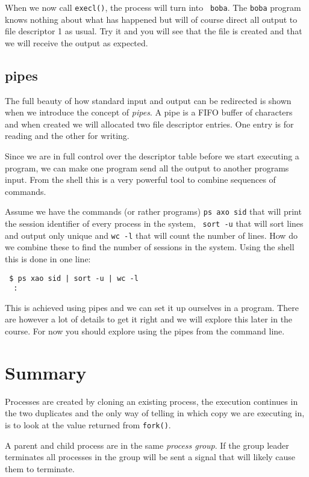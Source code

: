 \documentclass[a4paper,11pt]{article}
\begin{document}
When we now call {\tt execl()}, the process will turn into {\tt
  boba}. The {\tt boba} program knows nothing about what has happened
but will of course direct all output to file descriptor 1 as usual.
Try it and you will see that the file is created and that we will
receive the output as expected.

\subsection{pipes}

The full beauty of how standard input and output can be redirected is
shown when we introduce the concept of {\em pipes}. A pipe is a FIFO
buffer of characters and when created we will allocated two file
descriptor entries. One entry is for reading and the other for
writing. 

Since we are in full control over the descriptor table before we
start executing a program, we can make one program send all the output
to another programs input. From the shell this is a very powerful tool
to combine sequences of commands.

Assume we have the commands (or rather programs) {\tt ps axo sid} that
will print the session identifier of every process in the system, {\tt
  sort -u} that will sort lines and output only unique and {\tt wc -l}
that will count the number of lines. How do we combine these to find
the number of sessions in the system. Using the shell this is done in one line:

\begin{verbatim}
 $ ps xao sid | sort -u | wc -l
  :
\end{verbatim}

This is achieved using pipes and we can set it up ourselves in a
program. There are however a lot of details to get it right and we
will explore this later in the course. For now you should explore
using the pipes from the command line.

\section{Summary}

Processes are created by cloning an existing process, the execution
continues in the two duplicates and the only way of telling in which
copy we are executing in, is to look at the value returned from {\tt fork()}.

A parent and child process are in the same {\em process group}. If the
group leader terminates all processes in the group will be sent a
signal that will likely cause them to terminate. 
\end{document}
